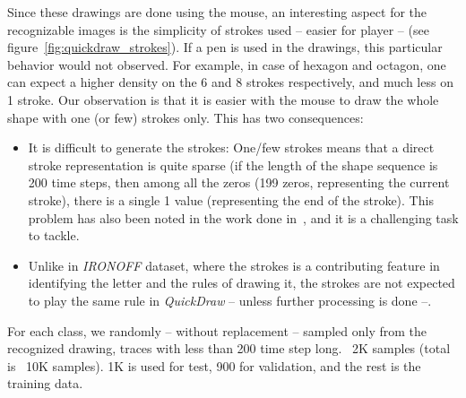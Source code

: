 
\par Since these drawings are done using the mouse, an interesting aspect for the recognizable images is the simplicity of strokes used -- easier for player -- (see figure~\ref{fig:quickdraw_strokes}). If a pen is used in the drawings, this particular behavior would not observed. For example, in case of hexagon and octagon, one can expect a higher density on the 6 and 8 strokes respectively, and much less on 1 stroke. Our observation is that it is easier with the mouse to draw the whole shape with one (or few) strokes only. This has two consequences:

\begin{itemize}
    \item It is difficult to generate the strokes: One/few strokes means that a direct stroke representation is quite sparse (if the length of the shape sequence is 200 time steps, then among all the zeros (199 zeros, representing the current stroke), there is a single 1 value (representing the end of the stroke). This problem has also been noted in the work done in~\citep{ha2017neural}, and it is a challenging task to tackle.
    \item Unlike in \textit{IRONOFF} dataset, where the strokes is a contributing feature in identifying the letter and the rules of drawing it, the strokes are not expected to play the same rule in \textit{QuickDraw} -- unless further processing is done --.
\end{itemize}

\par For each class, we randomly -- without replacement -- sampled only from the recognized drawing, traces with less than 200 time step long. ~2K samples (total is ~10K samples). 1K is used for test, 900 for validation, and the rest is the training data.


